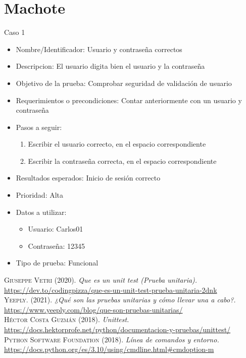 \documentclass[conference]{IEEEtran}
\begin{document}
\section{Machote}

Caso 1
\begin{itemize}
\item Nombre/Identificador: Usuario y contraseña correctos
\item Descripcion: El usuario digita bien el usuario y la contraseña
\item Objetivo de la prueba: Comprobar seguridad de validación de usuario
\item Requerimientos o precondiciones: Contar anteriormente con un usuario y contraseña
\item Pasos a seguir: 
\begin{enumerate}
\item Escribir el usuario correcto, en el espacio correspondiente
\item Escribir la contraseña correcta, en el espacio correspondiente
\end{enumerate}

\item Resultados esperados: Inicio de sesión correcto
\item Prioridad: Alta
\item Datos a utilizar:
\begin{itemize}
\item Usuario: Carlos01
\item Contraseña: 12345
\end{itemize}
\item Tipo de prueba: Funcional
\end{itemize}




\normalsize

\begin{thebibliography}{}


 \textsc{Giuseppe Vetri} (2020). \textit{Que es un unit test (Prueba unitaria).} \url{https://dev.to/codingpizza/que-es-un-unit-test-prueba-unitaria-2dnk}\\

 \textsc{Yeeply.} (2021). \textit{¿Qué son las pruebas unitarias y cómo llevar una a cabo?.} \url{https://www.yeeply.com/blog/que-son-pruebas-unitarias/} \\

 \textsc{Héctor Costa Guzmán} (2018). \textit{Unittest.} \url{https://docs.hektorprofe.net/python/documentacion-y-pruebas/unittest/} \\

 \textsc{Python Software Foundation} (2018). \textit{Línea de comandos y entorno.} \url{https://docs.python.org/es/3.10/using/cmdline.html#cmdoption-m} \\



\end{thebibliography}
\end{document}
